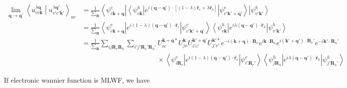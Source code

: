 \begin{equation}
  \begin{aligned}
    \lim_{\boldsymbol{q} \rightarrow \boldsymbol{q}'} 
    \left\langle u_{v c \boldsymbol{k}}^{\lambda\boldsymbol{q}} \middle| 
    u_{v' c' \boldsymbol{k}'}^{\lambda\boldsymbol{q}'} \right\rangle_{uc} 
    &= \frac{1}{\sum_{\boldsymbol{R}}} 
      \left\langle \psi_{c\boldsymbol{k}+\boldsymbol{q}}^{e} \right| \left\langle \psi_{v\boldsymbol{k}}^{h} \right| 
        e^{i(\boldsymbol{q} - \boldsymbol{q}') \cdot [(1-\lambda)\hat{\boldsymbol{r}}_e + \lambda\hat{\boldsymbol{r}}_h]} 
      \left| \psi_{c'\boldsymbol{k}'+\boldsymbol{q}'}^{e} \right\rangle \left| \psi_{v'\boldsymbol{k}'}^{h} \right\rangle \\
    &= \frac{1}{\sum_{\boldsymbol{R}}} 
      \left\langle \psi_{c\boldsymbol{k}+\boldsymbol{q}}^{e} \right| 
        e^{i(1-\lambda)(\boldsymbol{q} - \boldsymbol{q}') \cdot \hat{\boldsymbol{r}}_e} 
      \left| \psi_{c'\boldsymbol{k}'+\boldsymbol{q}'}^{e} \right\rangle 
      \left\langle \psi_{v\boldsymbol{k}}^{h} \right| 
        e^{i\lambda(\boldsymbol{q} - \boldsymbol{q}') \cdot \hat{\boldsymbol{r}}_h} 
      \left| \psi_{v'\boldsymbol{k}'}^{h} \right\rangle \\
    &= \frac{1}{\sum_{\boldsymbol{R}}} \sum_{ij\boldsymbol{R}_e\boldsymbol{R}_h}\sum_{i'j'\boldsymbol{R}_e'\boldsymbol{R}_h'}
      U_{ic}^{\boldsymbol{k}+\boldsymbol{q}*} U_{jv}^{\boldsymbol{k}} 
      U_{i'c'}^{\boldsymbol{k}'+\boldsymbol{q}'} U_{j'v'}^{\boldsymbol{k}'*} 
      e^{-i(\boldsymbol{k}+\boldsymbol{q}) \cdot \boldsymbol{R}_e} 
      e^{i\boldsymbol{k} \cdot \boldsymbol{R}_h}
      e^{i(\boldsymbol{k}'+\boldsymbol{q}') \cdot \boldsymbol{R}_e'}
      e^{-i\boldsymbol{k}' \cdot \boldsymbol{R}_h'} \\
    &\phantom{=\frac{1}{\sum_{R}} \sum_{ij\boldsymbol{R}_e\boldsymbol{R}_h}\sum_{i'j'\boldsymbol{R}_e'\boldsymbol{R}_h'}} 
      \times \left\langle \psi_{i\boldsymbol{R}_e}^{e} \right| 
        e^{i(1-\lambda)(\boldsymbol{q} - \boldsymbol{q}') \cdot \hat{\boldsymbol{r}}_e} 
      \left| \psi_{i'\boldsymbol{R}_e'}^{e} \right\rangle 
      \left\langle \psi_{j\boldsymbol{R}_h}^{h} \right| 
        e^{i\lambda(\boldsymbol{q} - \boldsymbol{q}') \cdot \hat{\boldsymbol{r}}_h} 
      \left| \psi_{j'\boldsymbol{R}_h'}^{h} \right\rangle 
  \end{aligned}
\end{equation}

\noindent
If electronic wannier function is MLWF, we have

